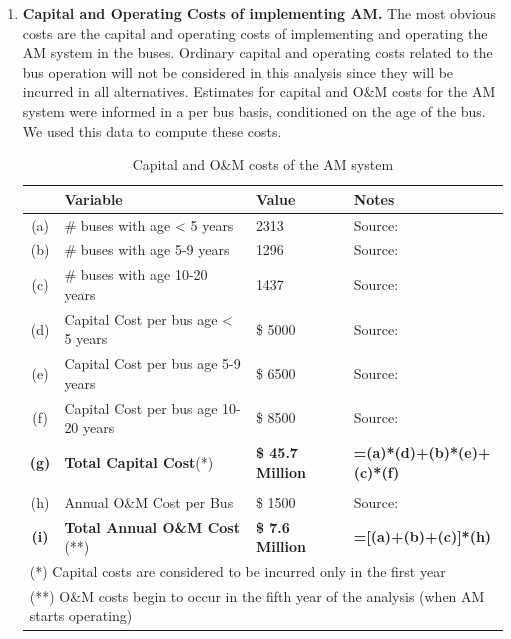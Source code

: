 \documentclass[11pt, letterpaper]{article}
\begin{document}
\begin{enumerate}[leftmargin=*]

\item \textbf{Capital and Operating Costs of implementing AM.}
  The most obvious costs are the capital and operating costs of implementing
  and operating the AM system in the buses. Ordinary capital and operating costs
  related to the bus operation will not be considered in this analysis since they
  will be incurred in all alternatives. Estimates for capital and O\&M costs for the AM 
  system were informed in a per bus basis, conditioned on the age of the bus. We 
  used this data to compute these costs.
  
  \begin{table}[h]
\caption{Capital and O\&M costs of the AM system}
\centering
\footnotesize
\renewcommand{\arraystretch}{1.1}
\begin{tabular}{c l l l}
\hline
 	& Variable 							& Value 				& Notes 						\\\hline\hline
(a)	& \# buses with age < 5 years				& 2313				& Source:						\\
(b)	& \# buses with age 5-9 years				& 1296				& Source:						\\
(c)	& \# buses with age 10-20 years			& 1437				& Source:						\\
(d)	& Capital Cost per bus age < 5 years		& \$ 5000				& Source:			\\
(e)	& Capital Cost per bus age 5-9 years		& \$ 6500				& Source:			\\
(f)	& Capital Cost per bus age 10-20 years		& \$ 8500				& Source:			\\
\textbf{(g)}	& \textbf{Total Capital Cost}(*)			& \textbf{\$ 45.7 Million}	& \textbf{=(a)*(d)+(b)*(e)+(c)*(f)}			\\
\\
(h)	& Annual O\&M Cost per Bus				& \$ 1500				& Source:		\\
\textbf{(i)}	& \textbf{Total Annual O\&M Cost} (**)	& \textbf{\$ 7.6 Million}	& \textbf{=[(a)+(b)+(c)]*(h)}			\\\hline\hline
\multicolumn{4}{l}{{\footnotesize (*) Capital costs are considered to be incurred only in the first year}} \\
\multicolumn{4}{l}{{\footnotesize (**) O\&M costs begin to occur in the fifth year of the analysis (when AM starts operating)}} \\
\end{tabular}
\label{tab:am.cost}
\end{table}%


\end{enumerate}
\end{document}
